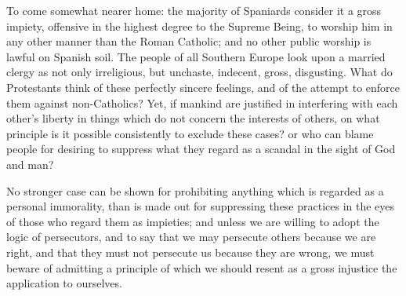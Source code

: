 \documentclass[12pt]{report}
\begin{document}
To come somewhat nearer home: the majority of Spaniards consider it a gross impiety, offensive in the highest degree to the Supreme Being, to worship him in any other manner than the Roman Catholic; and no other public worship is lawful on Spanish soil. The people of all Southern Europe look upon a married clergy as not only irreligious, but unchaste, indecent, gross, disgusting. What do Protestants think of these perfectly sincere feelings, and of the attempt to enforce them against non-Catholics? Yet, if mankind are justified in interfering with each other's liberty in things which do not concern the interests of others, on what principle is it possible consistently to exclude these cases? or who can blame people for desiring to suppress what they regard as a scandal in the sight of God and man?

No stronger case can be shown for prohibiting anything which is regarded as a personal immorality, than is made out for suppressing these practices in the eyes of those who regard them as impieties; and unless we are willing to adopt the logic of persecutors, and to say that we may persecute others because we are right, and that they must not persecute us because they are wrong, we must beware of admitting a principle of which we should resent as a gross injustice the application to ourselves.
\end{document}
